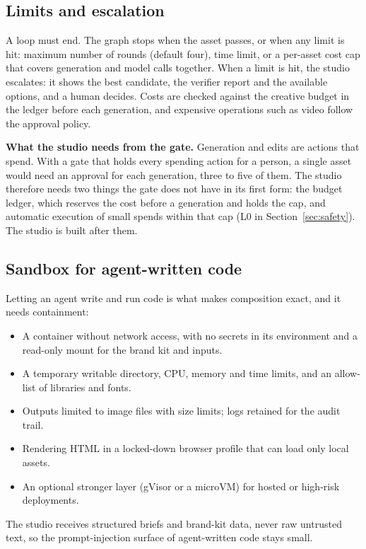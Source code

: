 \documentclass[11pt,a4paper]{article}
\begin{document}
\subsection{Limits and escalation}
A loop must end. The graph stops when the asset passes, or when any limit is hit: maximum number of rounds (default four), time limit, or a per-asset cost cap that covers generation and model calls together. When a limit is hit, the studio escalates: it shows the best candidate, the verifier report and the available options, and a human decides. Costs are checked against the creative budget in the ledger before each generation, and expensive operations such as video follow the approval policy.

\textbf{What the studio needs from the gate.} Generation and edits are actions that spend. With a gate that holds every spending action for a person, a single asset would need an approval for each generation, three to five of them. The studio therefore needs two things the gate does not have in its first form: the budget ledger, which reserves the cost before a generation and holds the cap, and automatic execution of small spends within that cap (L0 in Section~\ref{sec:safety}). The studio is built after them.

\subsection{Sandbox for agent-written code}
Letting an agent write and run code is what makes composition exact, and it needs containment:
\begin{itemize}
  \item A container without network access, with no secrets in its environment and a read-only mount for the brand kit and inputs.
  \item A temporary writable directory, CPU, memory and time limits, and an allow-list of libraries and fonts.
  \item Outputs limited to image files with size limits; logs retained for the audit trail.
  \item Rendering HTML in a locked-down browser profile that can load only local assets.
  \item An optional stronger layer (gVisor or a microVM) for hosted or high-risk deployments.
\end{itemize}
The studio receives structured briefs and brand-kit data, never raw untrusted text, so the prompt-injection surface of agent-written code stays small.
\end{document}
